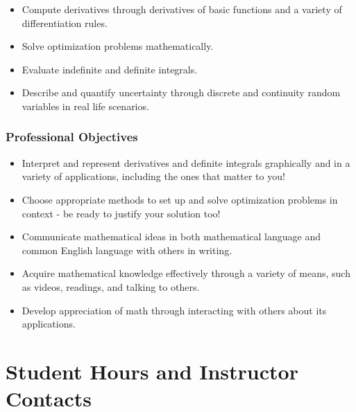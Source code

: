 \documentclass[12pt]{article}
\begin{document}
        \begin{itemize}
            \item Compute derivatives through derivatives of basic functions and a variety of differentiation rules.
            \item Solve optimization problems mathematically.
            \item Evaluate indefinite and definite integrals.
            \item Describe and quantify uncertainty through discrete and continuity random variables in real life scenarios.
        \end{itemize}

        \subsubsection{Professional Objectives}

        \begin{itemize}
            \item Interpret and represent derivatives and definite integrals graphically and in a variety of applications, including the ones that matter to you!
            \item Choose appropriate methods to set up and solve optimization problems in context - be ready to justify your solution too!
            \item Communicate mathematical ideas in both mathematical language and common English language with others in writing.
            \item Acquire mathematical knowledge effectively through a variety of means, such as videos, readings, and talking to others.
            \item Develop appreciation of math through interacting with others about its applications.
        \end{itemize}
        
        

	
	\section{Student Hours and Instructor Contacts}
\end{document}
